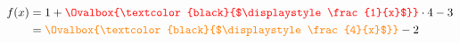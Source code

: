 \documentclass{minimal}
\newcommand{\highlight}[2][red]{%
  \textcolor{#1}{\Ovalbox{\textcolor{black}{$\displaystyle#2$}}}%
}
\begin{document}
\begin{align*}
  f(x) &= 1 + \highlight{\frac{1}{x}} \cdot 4 - 3 \\
       &= \highlight[orange]{\frac{4}{x}} - 2
\end{align*}
\end{document}
